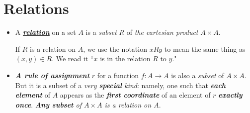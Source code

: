 \documentclass[11pt]{article}
\begin{document}
\section{Relations}
\begin{itemize}
\item \begin{definition}
A \underline{\emph{\textbf{relation}}} on a set $A$ is a \emph{subset} $R$ of \emph{the cartesian product} $A \times A$.

If $R$ is a relation on $A$, we use the notation $xRy$ to mean the same thing as $(x, y) \in R$. We read it ``$x$ is in the relation $R$ to $y$."
\end{definition}

\item \begin{remark}
\emph{\textbf{A rule of assignment}} $r$ for a function $f: A \rightarrow A$ is also a \emph{subset} of $A \times A$. But it is a subset of a \emph{very \textbf{special} kind}: namely, one such that \emph{\textbf{each element}} of $A$ appears as the \emph{\textbf{first coordinate}} of an element of $r$ \emph{\textbf{exactly once}}. \emph{\textbf{Any subset} of $A \times A$ is a relation on $A$}.
\end{remark}
\end{itemize}
\end{document}
